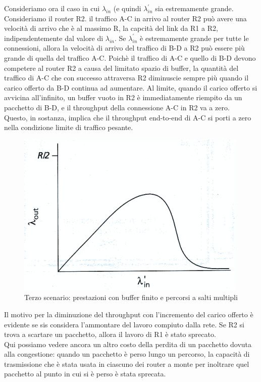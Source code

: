 \documentclass[11pt,a4paper]{book}
\begin{document}
Consideriamo ora il caso in cui $\lambda_{in}$ (e quindi $\lambda_{in}^{'}$ sia estremamente grande. Consideriamo il router R2. il traffico A-C in arrivo al router R2 può avere una velocità di arrivo che è al massimo R, la capcità del link da R1 a R2, indipendentemente dal valore di $\lambda_{in}$. Se $\lambda_{in}^{'}$ è estremamente grande per tutte le connessioni, allora la velocità di arrivo del traffico di B-D a R2 può essere più grande di quella del traffico A-C. Poichè il traffico di A-C e quello di B-D devono competere al router R2 a causa del limitato spazio di buffer, la quantità del traffico di A-C che con successo attraversa R2 diminuscie sempre più quando il carico offerto da B-D continua ad aumentare. Al limite, quando il carico offerto si avvicina all'infinito, un buffer vuoto in R2 è immediatamente riempito da un pacchetto di B-D, e il throughput della connessione A-C in R2 va a zero. \\
Questo, in sostanza, implica che il throughput end-to-end di A-C si porti a zero nella condizione limite di traffico pesante. \\
\begin{figure}
	\includegraphics[scale=0.6]{img/044.png}
	\caption{Terzo scenario: prestazioni con buffer finito e percorsi a salti multipli}
\end{figure}
Il motivo per la diminuzione del throughput con l'incremento del carico offerto è evidente se sis considera l'ammontare del lavoro compiuto dalla rete. Se R2 si trova a scartare un pacchetto, allora il lavoro di R1 è stato sprecato. \\
Qui possiamo vedere ancora un altro costo della perdita di un pacchetto dovuta alla congestione: quando un pacchetto è perso lungo un percorso, la capacità di trasmissione che è stata usata in ciascuno dei router a monte per inoltrare quel pacchetto al punto in cui si è perso è stata sprecata.
\end{document}
